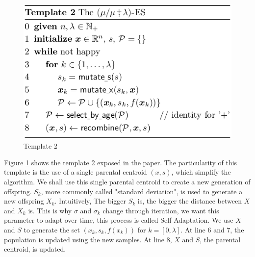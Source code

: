 \documentclass{article}
\begin{document}
\begin{figure}[H]
\begin{center} 
\includegraphics[scale=0.5]{figures/temp2.png}
\caption{Template 2}
\label{template2}
\end{center}
\end{figure}


Figure \ref{template2} shows the template 2 exposed in the paper. The particularity of this template is the use of a single parental centroid $(x, s)$, which simplify the algorithm. We shall use this single parental centroid to create a new generation of offspring. $S_{k}$, more commonly called "standard deviation",  is used to generate a new offspring $X_{k}$. Intuitively, The bigger $S_{k}$ is, the bigger the distance between $X$ and $X_{k}$ is. This is why $\sigma$ and $\sigma_k$ change through iteration, we want this parameter to adapt over time, this process is called Self Adaptation.
We use $X$ and $S$ to generate the set $(x_{k}, s_{k}, f(x_{k}))$ for $k = [0, \lambda]$. At line 6 and 7, the population is updated using the new samples. At line 8, $X$ and $S$, the parental centroid, is updated.
\end{document}
